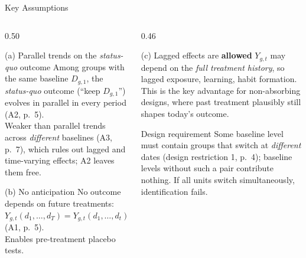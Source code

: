 \documentclass[main.tex]{subfiles}
\begin{document}
\begin{frame}{Key Assumptions}

  \begin{columns}[T]
    \begin{column}{0.50\textwidth}
      \begin{block}{(a) Parallel trends on the \emph{status-quo} outcome}
        Among groups with the same baseline $D_{g,1}$, the \emph{status-quo}
        outcome (``keep $D_{g,1}$'') evolves in parallel in every period
        (A2, p.~5).\\[6pt]
        Weaker than parallel trends across \emph{different} baselines
        (A3, p.~7), which rules out lagged and time-varying effects; A2
        leaves them free.
      \end{block}

      \medskip
      \begin{block}{(b) No anticipation}
        No outcome depends on future treatments:
        $Y_{g,t}(d_1,\dots,d_T)=Y_{g,t}(d_1,\dots,d_t)$ (A1, p.~5).\\[6pt]
        Enables pre-treatment placebo tests.
      \end{block}
    \end{column}
    \begin{column}{0.46\textwidth}
      \begin{block}{(c) Lagged effects are \textbf{allowed}}
        $Y_{g,t}$ may depend on the \emph{full treatment history}, so lagged
        exposure, learning, habit formation.\\[4pt]
        This is the key advantage for non-absorbing designs, where past
        treatment plausibly still shapes today's outcome.
      \end{block}

      \smallskip
      \begin{alertblock}{Design requirement}
        \footnotesize
        Some baseline level must contain groups that switch at
        \emph{different} dates (design restriction 1, p.~4); baseline
        levels without such a pair contribute nothing. If all units
        switch simultaneously, identification fails.
      \end{alertblock}
    \end{column}
  \end{columns}

\end{frame}
\end{document}
